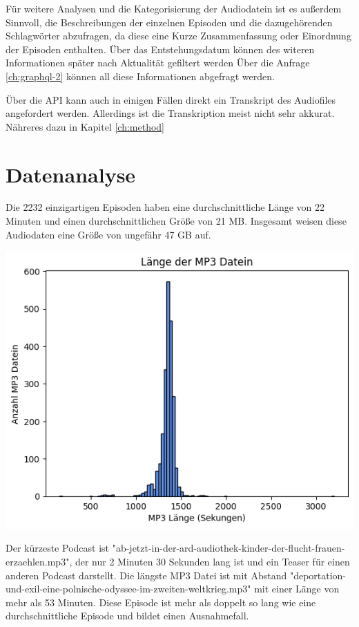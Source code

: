 Für weitere Analysen und die Kategorisierung der Audiodatein ist es außerdem Sinnvoll, die Beschreibungen der einzelnen Episoden und die dazugehörenden Schlagwörter abzufragen, da diese eine Kurze Zusammenfassung oder Einordnung der Episoden enthalten.
Über das Entstehungsdatum können des witeren Informationen später nach Aktualität gefiltert werden 
Über die Anfrage \autoref{ch:graphql-2} können all diese Informationen abgefragt werden.

Über die API kann auch in einigen Fällen direkt ein Transkript des Audiofiles angefordert werden. 
Allerdings ist die Transkription meist nicht sehr akkurat.
Nähreres dazu in Kapitel \autoref{ch:method}


\section{Datenanalyse}

Die 2232 einzigartigen Episoden haben eine durchschnittliche Länge von 22 Minuten und einen durchschnittlichen Größe von 21 MB.
Insgesamt weisen diese Audiodaten eine Größe von ungefähr 47 GB auf. 

\includegraphics[width=\linewidth]{figures/mp3_length.png}

Der kürzeste Podcast ist "ab-jetzt-in-der-ard-audiothek-kinder-der-flucht-frauen-erzaehlen.mp3", der nur 2 Minuten 30 Sekunden lang ist und ein Teaser für einen anderen Podcast darstellt.
Die längste MP3 Datei ist mit Abstand "deportation-und-exil-eine-polnische-odyssee-im-zweiten-weltkrieg.mp3" mit einer Länge von mehr als 53 Minuten.
Diese Episode ist mehr als doppelt so lang wie eine durchschnittliche Episode und bildet einen Ausnahmefall.

